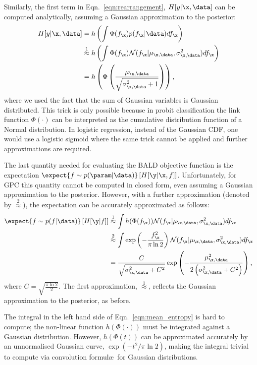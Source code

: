 Similarly, the first term in Eqn.\ \eqref{eqn:rearrangement}, $H[y\vert\x,\data]$ can be computed analytically, assuming a Gaussian approximation to the posterior:
%
\begin{align}
	H[y\vert\x,\data] &= h\left( \int \Phi( f_{\x} ) p(f_{\x}\vert\data) df_{\x} \right)\\
	&\stackrel{1}{\approx} h\left( \int \Phi( f_{\x} )  \mathcal{N}(f_{\x}\vert \mu_{\x,\data},\sigma_{\x,\data}^2) df_{\x} \right) \\
	&= h \left( \Phi\left( \frac{\mu_{\x,\data}}{\sqrt{\sigma^2_{\x,\data} + 1}} \right)\right),\label{ent_mean}
\end{align}
%
where we used the fact that the sum of Gaussian variables is Gaussian distributed. This trick is only possible because in probit classification the link function $\Phi(\cdot)$ can be interpreted as the cumulative distribution function of a Normal distribution. In logistic regression, instead of the Gaussian CDF, one would use a logistic sigmoid where the same trick cannot be applied and further approximations are required.

The last quantity needed for evaluating the BALD objective function is the expectation $\expect{f\sim p(\param|\data)} \left[ H[\y \vert \x,f] \right]$. Unfortunately, for GPC this quantity cannot be computed in closed form, even assuming a Gaussian approximation to the posterior. However, with a further approximation (denoted by $\stackrel{2}{\approx}$), the expectation can be accurately approximated as follows:
%
\begin{align}
	\expect{f \sim p(f\vert\data)} \left[ H[\y\vert f] \right] &\stackrel{1}{\approx}\int h(\Phi(f_{\x})) \mathcal{N}(f_{\x}\vert \mu_{\x,\data},\sigma_{\x,\data}^2)df_{\x}\label{eqn:mean_entropy}\\
	&\stackrel{2}{\approx} \int \exp\left(-\frac{f_{\x}^2}{\pi\ln2}\right) \mathcal{N}(f_{\x}\vert \mu_{\x,\data},\sigma_{\x,\data}^2)df_{\x}\\	
	&= \frac{C}{\sqrt{\sigma_{\x,\data}^2 + C^2}}\exp\left(-\frac{\mu_{\x,\data}^2}{2\left(\sigma_{\x,\data}^2 + C^2\right)}\right),
\end{align}
%
where $C=\sqrt{\frac{\pi\ln2}{2}}$. The first approximation, {\scriptsize $\stackrel{1}{\approx}$}, reflects the Gaussian approximation to the posterior, as before.

The integral in the left hand side of Eqn.\ \eqref{eqn:mean_entropy} is hard to compute; the non-linear function $h(\Phi(\cdot))$ must be integrated against a Gaussian distribution. However, $h(\Phi(t))$ can be approximated accurately by an unnormalised Gaussian curve, $\exp(-t^2/\pi\ln2)$, making the integral trivial to compute via convolution formul\ae\ for Gaussian distributions.

